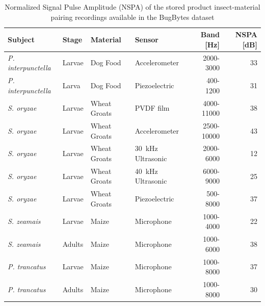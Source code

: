 \documentclass[../Vibro-Acoustic Signatures and Detection Algorithms for Stored Product Insects.tex]{subfiles}
\begin{document}
\begin{table}[!htbp]
	\caption[NSPA of BugBytes dataset recordings]{Normalized Signal Pulse Amplitude (NSPA) of the stored product insect-material pairing recordings available in the BugBytes dataset \label{tab:bugbytes}}
	\centering
    \small
	\begin{tabular}{llllrr}
		\toprule
		\textbf{Subject}           & \textbf{Stage} & \textbf{Material} & \textbf{Sensor}                 & \textbf{Band} [\si{\hertz}] & \textbf{NSPA} [\si{\deci\bel}] \\ \midrule
		\textit{P. interpunctella} & Larvae         & Dog Food          & Accelerometer                   & 2000-3000                   & 33                          \\
		\textit{P. interpunctella} & Larva          & Dog Food          & Piezoelectric                   & 400-1200                    & 31                          \\
		\textit{S. oryzae}         & Larvae         & Wheat Groats      & PVDF film                       & 4000-11000                  & 38                          \\
		\textit{S. oryzae}         & Larvae         & Wheat Groats      & Accelerometer                   & 2500-10000                  & 43                          \\
		\textit{S. oryzae}         & Larvae         & Wheat Groats      & \SI{30}{\kilo\hertz} Ultrasonic & 2000-6000                   & 12                          \\
		\textit{S. oryzae}         & Larvae         & Wheat Groats      & \SI{40}{\kilo\hertz} Ultrasonic & 6000-9000                   & 25                          \\
		\textit{S. oryzae}         & Larvae         & Wheat Groats      & Piezoelectric                   & 500-8000                    & 37                          \\
		\textit{S. zeamais}        & Larvae         & Maize             & Microphone                      & 1000-4000                   & 22                          \\
		\textit{S. zeamais}        & Adults         & Maize             & Microphone                      & 1000-6000                   & 38                          \\
		\textit{P. trancatus}      & Larvae         & Maize             & Microphone                      & 1000-8000                   & 37                          \\
		\textit{P. trancatus}      & Adults         & Maize             & Microphone                      & 1000-8000                   & 30                          \\ \bottomrule
	\end{tabular}
\end{table}
\end{document}
